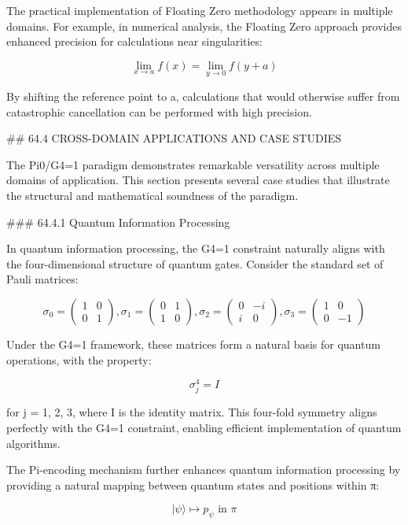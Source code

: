 The practical implementation of Floating Zero methodology appears in multiple domains. For example, in numerical analysis, the Floating Zero approach provides enhanced precision for calculations near singularities:

$$ \lim_{x \to a} f(x) = \lim_{y \to 0} f(y + a) $$

By shifting the reference point to a, calculations that would otherwise suffer from catastrophic cancellation can be performed with high precision.

## 64.4 CROSS-DOMAIN APPLICATIONS AND CASE STUDIES

The Pi0/G4=1 paradigm demonstrates remarkable versatility across multiple domains of application. This section presents several case studies that illustrate the structural and mathematical soundness of the paradigm.

### 64.4.1 Quantum Information Processing

In quantum information processing, the G4=1 constraint naturally aligns with the four-dimensional structure of quantum gates. Consider the standard set of Pauli matrices:

$$ \sigma_0 = \begin{pmatrix} 1 & 0 \\ 0 & 1 \end{pmatrix}, \sigma_1 = \begin{pmatrix} 0 & 1 \\ 1 & 0 \end{pmatrix}, \sigma_2 = \begin{pmatrix} 0 & -i \\ i & 0 \end{pmatrix}, \sigma_3 = \begin{pmatrix} 1 & 0 \\ 0 & -1 \end{pmatrix} $$

Under the G4=1 framework, these matrices form a natural basis for quantum operations, with the property:

$$ \sigma_j^4 = I $$

for j = 1, 2, 3, where I is the identity matrix. This four-fold symmetry aligns perfectly with the G4=1 constraint, enabling efficient implementation of quantum algorithms.

The Pi-encoding mechanism further enhances quantum information processing by providing a natural mapping between quantum states and positions within π:

$$ |\psi\rangle \mapsto p_\psi \text{ in } \pi $$

